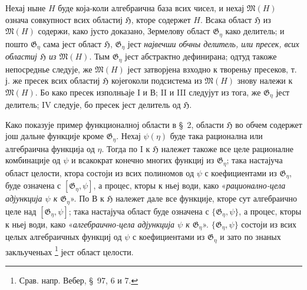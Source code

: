 ﻿\documentclass[11pt]{article}
\begin{document}
Нехај ныне $H$ буде која-коли алгебраична база всих чисел, и нехај
$\mathfrak M(H)$ означа совкупност всих областиј $\mathfrak H$, кторе содержет
$H$. Всака област $\mathfrak H$ из $\mathfrak M(H)$ содержи, како јусто
доказано, Зермелову област $\mathfrak G_\eta$ како делитель; и пошто
$\mathfrak G_\eta$ сама јест област $\mathfrak H$, $\mathfrak G_\eta$ јест
{\itshape највечши обчны делитель, или пресек, всих областиј $\mathfrak H$ из
$\mathfrak M(H)$}. Тым $\mathfrak G_\eta$ јест абстрактно дефинирана; одтуд
такоже непосреднье следује, же $\mathfrak M(H)$ јест затворјена взходно к
твореньу пресеков, т. ј. же пресек всих областиј $\mathfrak H$ којегоколи
подсистема из $\mathfrak M(H)$ знову належи к $\mathfrak M(H)$. Бо како пресек
изполньаје I и В; II и III следујут из тога, же $\mathfrak G_\eta$ јест
делитель; IV следује, бо пресек јест делитель од $\mathfrak H$.

Како показује пример функционалној области в \S\ 2, области $\mathfrak H$ во
обчем содержет још дальне функције кроме $\mathfrak G_\eta$. Нехај
$\psi(\eta)$ буде така рационална или алгебраична функција од $\eta$. Тогда по
I к $\mathfrak H$ належет такоже все целе рационалне комбинације од $\psi$ и
всакократ конечно многих функциј из $\mathfrak G_\eta$; така настајуча област
целости, ктора состоји из всих полиномов од $\psi$ с коефициентами из
$\mathfrak G_\eta$, буде означена с $[\mathfrak G_\eta,\psi]$, а процес, кторы
к ньеј води, како «{\itshape рационално-цела адјункција $\psi$ к
$\mathfrak G_\eta$}». По В к $\mathfrak H$ належет дале все функције, кторе сут
алгебраично целе над $[\mathfrak G_\eta,\psi]$; така настајуча област буде
означена с $\{\mathfrak G_\eta,\psi\}$, а процес, кторы к ньеј води, како
«{\itshape алгебраично-цела адјункција $\psi$ к $\mathfrak G_\eta$}».
$\{\mathfrak G_\eta,\psi\}$ состоји из всих целых алгебраичных функциј од
$\psi$ с коефициентами из $\mathfrak G_\eta$ и зато по знаных закльученьах
\footnote{Срав. напр. Вебер, \S\ 97, 6 и 7.} јест област целости.
\end{document}
